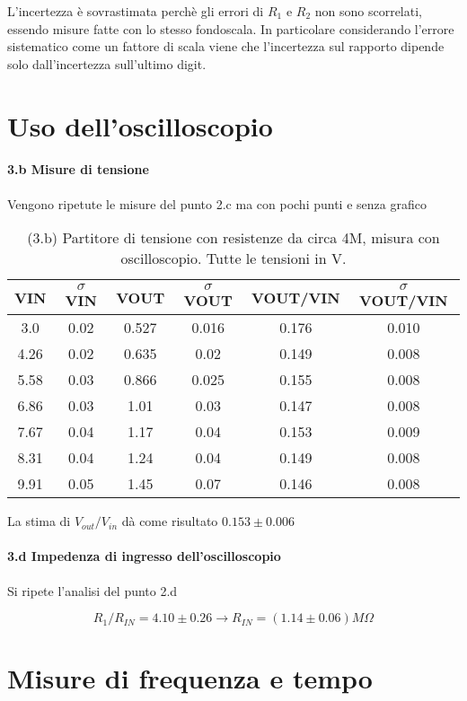 \documentclass[10pt,a4paper]{article}
\begin{document}
L'incertezza è sovrastimata perchè gli errori di $R_1$ e $R_2$ non sono scorrelati, essendo misure fatte con lo stesso fondoscala. In particolare considerando l'errore sistematico come un fattore di scala viene che l'incertezza sul rapporto dipende solo dall'incertezza sull'ultimo digit.

\section{Uso dell'oscilloscopio}

\paragraph{3.b Misure di tensione} 
Vengono ripetute le misure del punto 2.c  ma con pochi punti e senza grafico
\begin{table}[h]
\centering
\begin{tabular}{|c|c|c|c|c|c|}
\hline 
VIN& $\sigma$ VIN  &VOUT	 & $\sigma$ VOUT& VOUT/VIN & $\sigma$ VOUT/VIN \\
\hline 

3.0 & 0.02 & 0.527 & 0.016 & 0.176 & 0.010 \\
4.26 & 0.02 & 0.635 & 0.02 & 0.149 & 0.008 \\
5.58 & 0.03 & 0.866 & 0.025 & 0.155 & 0.008 \\
6.86 & 0.03 & 1.01 & 0.03 & 0.147 & 0.008\\
7.67 & 0.04 & 1.17 & 0.04 & 0.153 & 0.009\\
8.31 & 0.04 & 1.24 & 0.04 & 0.149 & 0.008\\
9.91 & 0.05 & 1.45 & 0.07 & 0.146 & 0.008 \\
\hline 
\end{tabular} 
\caption{(3.b) Partitore di tensione con resistenze da circa 4M, misura con oscilloscopio. Tutte le tensioni in V.}
\end{table}

La stima di $V_{out}/{V_{in}}$ dà come risultato $0.153\pm0.006$



\paragraph{3.d Impedenza di ingresso dell'oscilloscopio} Si ripete l'analisi del punto 2.d

\[ R_1/R_{IN} = 4.10  \pm  0.26  \rightarrow  R_{IN} = (1.14 \pm  0.06)  M\Omega
\]


\section{Misure di frequenza e tempo}
\end{document}
